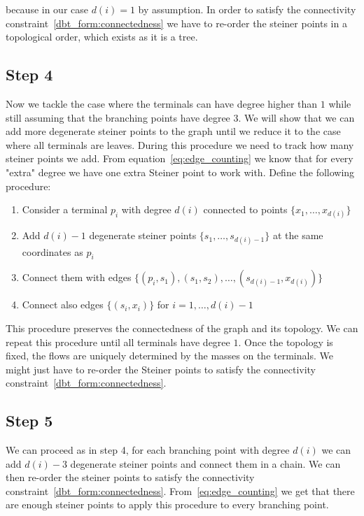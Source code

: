 \documentclass[11pt,reqno,a4paper]{amsart}
\numberwithin{equation}{section}
\theoremstyle{mytheorem}
\theoremstyle{myremark}
\theoremstyle{myparagraph}
\begin{document}
    because in our case $d(i)=1$ by assumption.
    In order to satisfy the connectivity constraint~\ref{dbt_form:connectedness} we have to re-order
    the steiner points in a topological order, which exists as it is a tree.

    \subsection{Step 4}
    Now we tackle the case where the terminals can have degree higher than $1$ while still assuming that the branching points have
    degree $3$.
    We will show that we can add more degenerate steiner points to the graph until we reduce it to the case where all terminals are leaves.
    During this procedure we need to track how many steiner points we add.
    From equation~\ref{eq:edge_counting} we know that for every "extra" degree we have one extra Steiner point to work with.
    Define the following procedure:
    \begin{enumerate}
        \item Consider a terminal $p_i$ with degree $d(i)$ connected to points $\{x_1, \dots, x_{d(i)}\}$
        \item Add $d(i) - 1$ degenerate steiner points $\{s_1, \dots, s_{d(i)-1}\}$ at the same coordinates as $p_i$
        \item Connect them with edges $\{ (p_i, s_1), (s_1, s_2), \dots, (s_{d(i)-1}, x_{d(i)}) \}$
        \item Connect also edges $\{ (s_i, x_i) \}$ for $i = 1, \dots, d(i)-1$
    \end{enumerate}
    This procedure preserves the connectedness of the graph and its topology. We can repeat this procedure until all terminals
    have degree $1$.
    Once the topology is fixed, the flows are uniquely determined by the masses on the terminals. We might just have to
    re-order the Steiner points to satisfy the connectivity constraint~\ref{dbt_form:connectedness}.

    \subsection{Step 5}

    We can proceed as in step 4, for each branching point with degree $d(i)$ we can add $d(i) - 3$ degenerate steiner points
    and connect them in a chain. We can then re-order the steiner points to satisfy the connectivity constraint~\ref{dbt_form:connectedness}.
    From~\ref{eq:edge_counting} we get that there are enough steiner points to apply this procedure to every branching point.
\end{document}
